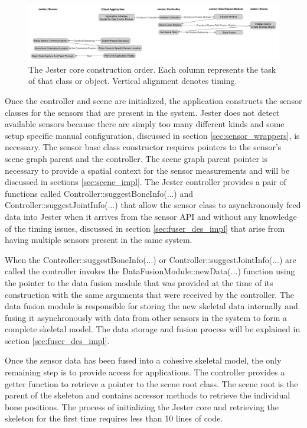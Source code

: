 \begin{figure}[]
\centering
\includegraphics[width=1\textwidth]{figures/constructionOrder}
\caption{The Jester core construction order. Each column represents the task of that class or object. Vertical alignment denotes timing.}
\label{fig:const_order}
\end{figure}

Once the controller and scene are initialized, the application constructs the sensor classes for the sensors that are present in the system. Jester does not detect available sensors because there are simply too many different kinds and some setup specific manual configuration, discussed in section \ref{sec:sensor_wrappers}, is necessary. The sensor base class constructor requires pointers to the sensor’s scene graph parent and the controller. The scene graph parent pointer is necessary to provide a spatial context for the sensor measurements and will be discussed in sections \ref{sec:scene_impl}. The Jester controller provides a pair of functions called Controller::suggestBoneInfo(...) and Controller::suggestJointInfo(...) that allow the sensor class to asynchronously feed data into Jester when it arrives from the sensor API and without any knowledge of the timing issues, discussed in section \ref{sec:fuser_des_impl} that arise from having multiple sensors present in the same system.

When the Controller::suggestBoneInfo(...) or Controller::suggestJointInfo(...) are called the controller invokes the DataFusionModule::newData(...) function using the pointer to the data fusion module that was provided at the time of its construction with the same arguments that were received by the controller. The  data fusion module is responsible for storing the new skeletal data internally and fusing it asynchronously with data from other sensors in the system to form a complete skeletal model. The data storage and fusion process will be explained in section \ref{sec:fuser_des_impl}.

Once the sensor data has been fused into a cohesive skeletal model, the only remaining step is to provide access for applications. The controller provides a getter function to retrieve a pointer to the scene root class. The scene root is the parent of the skeleton and contains accessor methods to retrieve the individual bone positions. The process of initializing the Jester core and retrieving the skeleton for the first time requires less than 10 lines of code.

